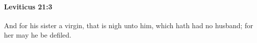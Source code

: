 
		\paragraph{Leviticus 21:3} %
			\label{LEVITICUS-21-3}

			And for his sister a virgin, that is nigh unto him, which hath had no husband; for her may he be defiled.


